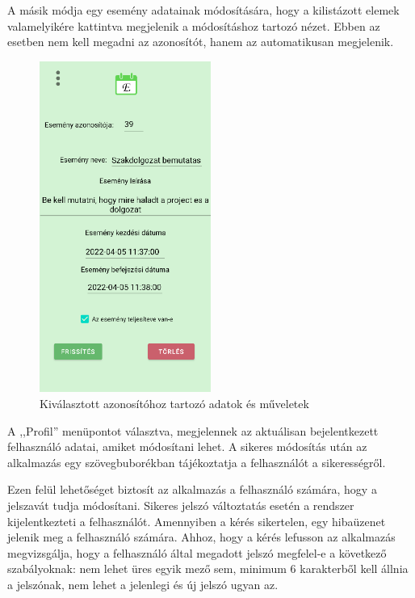 \documentclass[
]{thesis-ekf}
\theoremstyle{definition}
\theoremstyle{remark}
\begin{document}
	A másik módja egy esemény adatainak módosítására, hogy a kilistázott elemek valamelyikére kattintva megjelenik a módosításhoz tartozó nézet. Ebben az esetben nem kell megadni az azonosítót, hanem az automatikusan megjelenik. 
	
	\begin{figure}[ht!]
		\centering
		\includegraphics[width=0.5\textwidth]{android_app/android_specify_event}
		\caption{Kiválasztott azonosítóhoz tartozó adatok és műveletek}
		\label{figure:android_specify_event}
	\end{figure}
	
	A ,,Profil'' menüpontot választva, megjelennek az aktuálisan bejelentkezett felhasználó adatai, amiket módosítani lehet. A sikeres módosítás után az alkalmazás egy szövegbuborékban tájékoztatja a felhasználót a sikerességről. 
	
	Ezen felül lehetőséget biztosít az alkalmazás a felhasználó számára, hogy a jelszavát tudja módosítani. Sikeres jelszó változtatás esetén a rendszer kijelentkezteti a felhasználót. Amennyiben a kérés sikertelen, egy hibaüzenet jelenik meg a felhasználó számára. Ahhoz, hogy a kérés lefusson az alkalmazás megvizsgálja, hogy a felhasználó által megadott jelszó megfelel-e a következő szabályoknak: nem lehet üres egyik mező sem, minimum 6 karakterből kell állnia a jelszónak, nem lehet a jelenlegi és új jelszó ugyan az.
	
\end{document}
